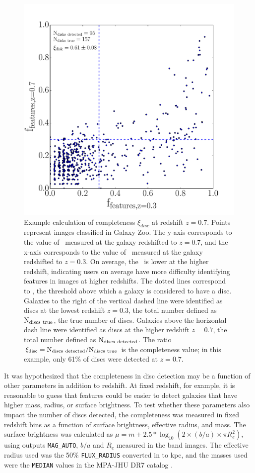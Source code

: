 \documentclass[useAMS,usenatbib]{mn2e}
\begin{document}
\begin{figure}
\centering
\includegraphics[width=.4\textwidth]{figures/incompleteness_z7.pdf}
\caption{Example calculation of completeness $\xi_{disc}$ at redshift $z=0.7$. Points represent  images classified in Galaxy Zoo. The y-axis corresponds to the value of \ffeatures~measured at the galaxy redshifted to $z=0.7$, and the x-axis corresponds to the value of \ffeatures~measured at the galaxy redshifted to $z=0.3$. On average, the \ffeatures~is lower at the higher redshift, indicating users on average have more difficulty identifying features in images at higher redshifts. The dotted lines correspond to , the threshold above which a galaxy is considered to have a disc. Galaxies to the right of the vertical dashed line were identified as discs at the lowest redshift $z=0.3$, the total number defined as $\rm N_{discs~true}$, the true number of discs. Galaxies above the horizontal dash line were identified as discs at the higher redshift $z=0.7$, the total number defined as $\rm N_{discs~detected}$. The ratio $\rm \xi_{disc}=N_{discs~detected}/N_{discs~true}$ is the completeness value; in this example, only 61\% of discs were detected at $z=0.7$.}
\label{fig:inc_subplot}
\end{figure}

It was hypothesized that the completeness in disc detection may be a function of other parameters in addition to redshift. At fixed redshift, for example, it is reasonable to guess that features could be easier to detect galaxies that have higher mass, radius, or surface brightness. To test whether these parameters also impact the number of discs detected, the completeness was measured in fixed redshift bins as a function of surface brightness, effective radius, and mass. The surface brightness was calculated as $\mu = m + 2.5*\log_{10}{(2 \times (b/a) \times \pi R_e^2 )}$, using \sextractor{} outputs {\tt MAG\_AUTO}, $b/a$ and $R_{e}$ measured in the \Iband{} band images. The effective radius used was the 50\% {\tt FLUX\_RADIUS} converted in to kpc, and the masses used were the {\tt MEDIAN} values in the MPA-JHU DR7 catalog \citep{Kauffmann2003b}.
\end{document}
